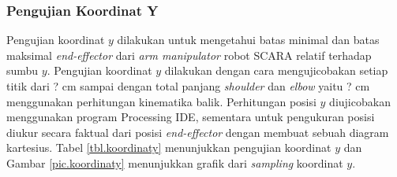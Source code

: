 \subsubsection{Pengujian Koordinat Y}
Pengujian koordinat $y$ dilakukan untuk mengetahui batas minimal dan batas maksimal \textit{end-effector} dari \textit{arm manipulator} robot SCARA relatif terhadap sumbu $y$. Pengujian koordinat $y$ dilakukan dengan cara mengujicobakan setiap titik dari ? cm sampai dengan total panjang \textit{shoulder} dan \textit{elbow} yaitu ? cm menggunakan perhitungan kinematika balik. Perhitungan posisi $y$ diujicobakan menggunakan program Processing IDE, sementara untuk pengukuran posisi diukur secara faktual dari posisi \textit{end-effector} dengan membuat sebuah diagram kartesius. Tabel \ref{tbl.koordinaty} menunjukkan pengujian koordinat $y$ dan Gambar \ref{pic.koordinaty} menunjukkan grafik dari \textit{sampling} koordinat $y$.
